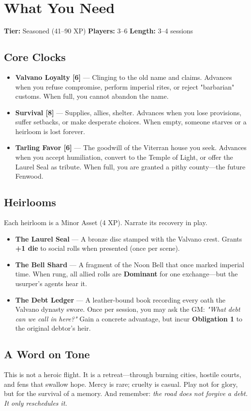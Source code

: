 \documentclass[11pt]{book}
\begin{document}
\section*{What You Need}
\textbf{Tier:} Seasoned (41--90 XP) \quad \textbf{Players:} 3--6 \quad \textbf{Length:} 3--4 sessions

\subsection*{Core Clocks}
\begin{itemize}
\item \textbf{Valvano Loyalty [6]} --- Clinging to the old name and claims. Advances when you refuse compromise, perform imperial rites, or reject "barbarian" customs. When full, you cannot abandon the name.
\item \textbf{Survival [8]} --- Supplies, allies, shelter. Advances when you lose provisions, suffer setbacks, or make desperate choices. When empty, someone starves or a heirloom is lost forever.
\item \textbf{Tarling Favor [6]} --- The goodwill of the Viterran house you seek. Advances when you accept humiliation, convert to the Temple of Light, or offer the Laurel Seal as tribute. When full, you are granted a pithy county---the future Fenwood.
\end{itemize}

\subsection*{Heirlooms}
Each heirloom is a Minor Asset (4 XP). Narrate its recovery in play.
\begin{itemize}
\item \textbf{The Laurel Seal} --- A bronze disc stamped with the Valvano crest. Grants \textbf{+1 die} to social rolls when presented (once per scene).
\item \textbf{The Bell Shard} --- A fragment of the Noon Bell that once marked imperial time. When rung, all allied rolls are \textbf{Dominant} for one exchange---but the usurper's agents hear it.
\item \textbf{The Debt Ledger} --- A leather-bound book recording every oath the Valvano dynasty swore. Once per session, you may ask the GM: \textit{"What debt can we call in here?"} Gain a concrete advantage, but incur \textbf{Obligation 1} to the original debtor's heir.
\end{itemize}

\subsection*{A Word on Tone}
This is not a heroic flight. It is a retreat---through burning cities, hostile courts, and fens that swallow hope. Mercy is rare; cruelty is casual. Play not for glory, but for the survival of a memory. And remember: \textit{the road does not forgive a debt. It only reschedules it.}
\end{document}
